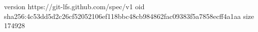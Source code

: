 version https://git-lfs.github.com/spec/v1
oid sha256:4c53dd5d2c26cf52052106ef118bbc48cb984862fac09383f5a7858ecff4a1aa
size 174928
